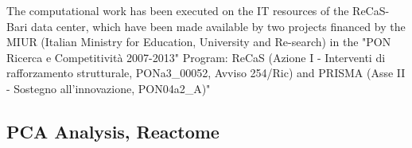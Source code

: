 The computational work has been executed on the IT resources of the ReCaS-Bari data center, which have been made available by two projects financed by the MIUR (Italian Ministry for Education, University and Re-search) in the "PON Ricerca e Competitività 2007-2013" Program: ReCaS (Azione I - Interventi di rafforzamento strutturale, PONa3\_00052, Avviso 254/Ric) and PRISMA (Asse II - Sostegno all'innovazione, PON04a2\_A)"


\subsection*{PCA Analysis, Reactome} 



